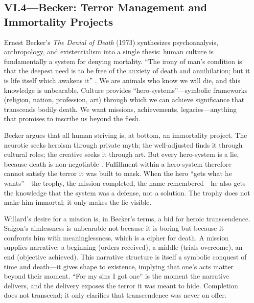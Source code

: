 \subsection*{VI.4—Becker: Terror Management and Immortality Projects}
\label{ssec:vi-becker}

Ernest Becker's \textit{The Denial of Death} (1973) synthesizes psychoanalysis, anthropology, 
and existentialism into a single thesis: human culture is fundamentally a system for denying 
mortality. ``The irony of man's condition is that the deepest need is to be free of the 
anxiety of death and annihilation; but it is life itself which awakens it'' 
\parencite[p.~66]{BeckerDenial1973}. We are animals who know we will die, and this knowledge 
is unbearable. Culture provides ``hero-systems''---symbolic frameworks (religion, nation, 
profession, art) through which we can achieve significance that transcends bodily death. We 
want missions, achievements, legacies---anything that promises to inscribe us beyond the flesh.

Becker argues that all human striving is, at bottom, an immortality project. The neurotic 
seeks heroism through private myth; the well-adjusted finds it through cultural roles; the 
creative seeks it through art. But every hero-system is a lie, because death is non-negotiable 
\parencite[pp.~26--27]{BeckerDenial1973}. Fulfillment within a hero-system therefore cannot 
satisfy the terror it was built to mask. When the hero ``gets what he wants''---the trophy, 
the mission completed, the name remembered---he also gets the knowledge that the system was a 
defense, not a solution. The trophy does not make him immortal; it only makes the lie visible.

Willard's desire for a mission is, in Becker's terms, a bid for heroic transcendence. Saigon's 
aimlessness is unbearable not because it is boring but because it confronts him with 
meaninglessness, which is a cipher for death. A mission supplies narrative: a beginning 
(orders received), a middle (trials overcome), an end (objective achieved). This narrative 
structure is itself a symbolic conquest of time and death---it gives shape to existence, 
implying that one's acts matter beyond their moment. ``For my sins I got one'' is the moment 
the narrative delivers, and the delivery exposes the terror it was meant to hide. Completion 
does not transcend; it only clarifies that transcendence was never on offer.

